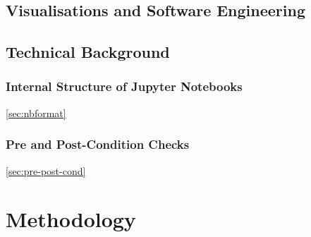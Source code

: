 \documentclass[acmsmall,screen,review,anonymous]{acmart}
\begin{document}



\subsection{Visualisations and Software Engineering}\label{sec:visualisations}


\subsection{Technical Background}\label{sec:background}
\subsubsection{Internal Structure of Jupyter Notebooks}\ref{sec:nbformat}

\subsubsection{Pre and Post-Condition Checks}\ref{sec:pre-post-cond}


\section{Methodology}\label{sec:method}
\end{document}
